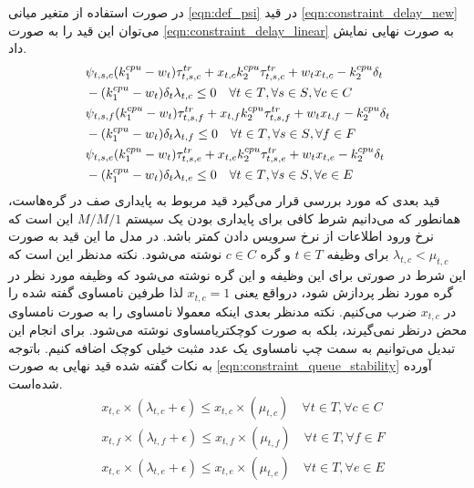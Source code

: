 	در صورت استفاده از متغیر میانی \cref{eqn:def_psi} در قید \cref{eqn:constraint_delay_new} می‌توان این قید را به صورت \cref{eqn:constraint_delay_linear} به صورت نهایی نمایش داد. 
	\begin{subequations}\label{eqn:constraint_delay_linear}
		\begin{align}
		&\notag\psi_{t,s,c}(k_1^{cpu}-w_t)\tau^{tr}_{t,s,c} + x_{t,c}k_2^{cpu}\tau_{t,s,c}^{tr}+w_t x_{t,c}-k_2^{cpu}\delta_t \\ &-(k_1^{cpu}-w_t)\delta_t\lambda_{t,c} \le 0 \quad \forall{t \in T}, \forall{s \in S}, \forall{c \in C} \\
		&\notag\psi_{t,s,f}(k_1^{cpu}-w_t)\tau^{tr}_{t,s,f} + x_{t,f}k_2^{cpu}\tau_{t,s,f}^{tr}+w_t x_{t,f}-k_2^{cpu}\delta_t \\ &-(k_1^{cpu}-w_t)\delta_t\lambda_{t,f} \le 0 \quad \forall{t \in T}, \forall{s \in S}, \forall{f \in F} \\
		&\notag\psi_{t,s,e}(k_1^{cpu}-w_t)\tau^{tr}_{t,s,e} + x_{t,e}k_2^{cpu}\tau_{t,s,e}^{tr}+w_t x_{t,e}-k_2^{cpu}\delta_t \\ &-(k_1^{cpu}-w_t)\delta_t\lambda_{t,e} \le 0 \quad \forall{t \in T}, \forall{s \in S}, \forall{e \in E}
		\end{align}
	\end{subequations}
	قید بعدی که مورد بررسی قرار می‌گیرد قید مربوط به پایداری صف در گره‌هاست، همانطور که می‌دانیم شرط کافی برای پایداری بودن یک سیستم $M/M/1$ این است که نرخ ورود اطلاعات از نرخ سرویس دادن کمتر باشد. در مدل ما این قید به صورت $\lambda_{t,c} < \mu_{t,c}$ برای وظیفه $t \in T$ و گره $c \in C$ نوشته می‌شود. نکته مدنظر این است که این شرط در صورتی برای این وظیفه و این گره نوشته می‌شود که وظیفه مورد نظر در گره مورد نظر پردازش شود، درواقع یعنی $x_{t,c} = 1$ لذا طرفین نامساوی گفته شده را در $x_{t,c}$ ضرب می‌کنیم. نکته مدنظر بعدی اینکه معمولا نامساوی را به صورت نامساوی محض درنظر نمی‌گیرند، بلکه به صورت کوچکتریامساوی نوشته می‌شود. برای انجام این تبدیل می‌توانیم به سمت چپ نامساوی یک عدد مثبت خیلی کوچک اضافه کنیم. باتوجه به نکات گفته شده قید نهایی به صورت \cref{eqn:constraint_queue_stability} آورده شده‌است.
	\begin{subequations}\label{eqn:constraint_queue_stability}
		\begin{align}
		&x_{t,c}\times(\lambda_{t,c} + \epsilon) \le x_{t,c}\times(\mu_{t,c}) \quad \forall{t \in T}, \forall{c \in C}\\
		&x_{t,f}\times(\lambda_{t,f} + \epsilon) \le x_{t,f}\times(\mu_{t,f}) \quad \forall{t \in T}, \forall{f \in F} \\
		&x_{t,e}\times(\lambda_{t,e} + \epsilon) \le x_{t,e}\times(\mu_{t,e}) \quad \forall{t \in T}, \forall{e \in E}
		\end{align}
	\end{subequations}

